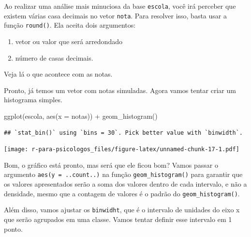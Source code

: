 \documentclass[
]{book}
\newenvironment{Shaded}{\begin{snugshade}}{\end{snugshade}}
\newcommand{\AttributeTok}[1]{\textcolor[rgb]{0.77,0.63,0.00}{#1}}
\newcommand{\DecValTok}[1]{\textcolor[rgb]{0.00,0.00,0.81}{#1}}
\newcommand{\FunctionTok}[1]{\textcolor[rgb]{0.00,0.00,0.00}{#1}}
\newcommand{\NormalTok}[1]{#1}
\newcommand{\OtherTok}[1]{\textcolor[rgb]{0.56,0.35,0.01}{#1}}
\newcommand{\SpecialCharTok}[1]{\textcolor[rgb]{0.00,0.00,0.00}{#1}}
\providecommand{\tightlist}{%
  \setlength{\itemsep}{0pt}\setlength{\parskip}{0pt}}
\begin{document}
Ao realizar uma análise mais minuciosa da base \texttt{escola}, você irá perceber que existem várias casa decimais no vetor \texttt{nota}. Para resolver isso, basta usar a função \texttt{round()}. Ela aceita dois argumentos:

\begin{enumerate}
\def\labelenumi{\arabic{enumi}.}
\tightlist
\item
  vetor ou valor que será arredondado
\item
  número de casas decimais.
\end{enumerate}

\begin{Shaded}
\end{Shaded}

Veja lá o que acontece com as notas.

Pronto, já temos um vetor com notas simuladas. Agora vamos tentar criar um histograma simples.

\begin{Shaded}
\begin{Highlighting}[]
\FunctionTok{ggplot}\NormalTok{(escola, }\FunctionTok{aes}\NormalTok{(}\AttributeTok{x =}\NormalTok{ notas)) }\SpecialCharTok{+} 
  \FunctionTok{geom\_histogram}\NormalTok{()}
\end{Highlighting}
\end{Shaded}

\begin{verbatim}
## `stat_bin()` using `bins = 30`. Pick better value with `binwidth`.
\end{verbatim}

\texttt{[image: r-para-psicologos\_files/figure-latex/unnamed-chunk-17-1.pdf]}

Bom, o gráfico está pronto, mas será que ele ficou bom? Vamos passar o argumento \texttt{aes(y\ =\ ..count..)} na função \texttt{geom\_histogram()} para garantir que os valores apresentados serão a soma dos valores dentro de cada intervalo, e não a densidade, mesmo que a contagem de valores é o padrão do \texttt{geom\_histogram()}.

Além disso, vamos ajustar os \texttt{binwidht}, que é o intervalo de unidades do eixo x que serão agrupados em uma classe. Vamos tentar definir esse intervalo em 1 ponto.
\end{document}
